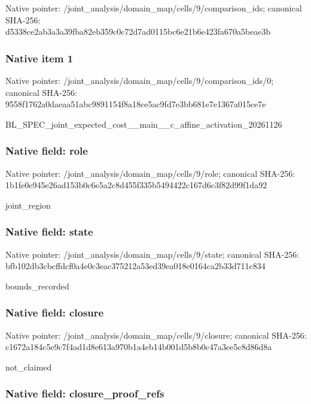 \documentclass[10pt,a4paper]{article}
\begin{document}
Native pointer: /joint\_analysis/domain\_m\allowbreak{}ap/cells/9/comparison\_id\allowbreak{}s; canonical SHA-256: d5338ce2ab3a3a39fba82eb3\allowbreak{}59c0c72d7ad0115bc6e21b6e\allowbreak{}423fa670a5beae3b



\subsubsection{Native item 1}


Native pointer: /joint\_analysis/domain\_m\allowbreak{}ap/cells/9/comparison\_id\allowbreak{}s/0; canonical SHA-256: 9558f1762a0daeaa51abc989\allowbreak{}1154f8a18ce5ac9fd7e3bb68\allowbreak{}1e7e1367a015ce7e


BL\_SPEC\_joint\_expected\_c\allowbreak{}ost\_\_main\_\_c\_affine\_acti\allowbreak{}vation\_20261126


\subsubsection{Native field: role}


Native pointer: /joint\_analysis/domain\_map/cells/9/role; canonical SHA-256: 1b1fe0e945e26ad153b0c6e5\allowbreak{}a2c8d455f335b5494422c167\allowbreak{}d6c3f82d99f1da92


joint\_region


\subsubsection{Native field: state}


Native pointer: /joint\_analysis/domain\_m\allowbreak{}ap/cells/9/state; canonical SHA-256: bfb102db3cbcffdcf0a4e0c3\allowbreak{}eac375212a53ed39ea018e01\allowbreak{}64ca2b33d711c834


bounds\_recorded


\subsubsection{Native field: closure}


Native pointer: /joint\_analysis/domain\_m\allowbreak{}ap/cells/9/closure; canonical SHA-256: c1672a184c5e9c7f4ad1d8e6\allowbreak{}13a970b1a4eb14b001d5b8b0\allowbreak{}c47a3ee5c8d86d8a


not\_claimed


\subsubsection{Native field: closure\_proof\_refs}
\end{document}

